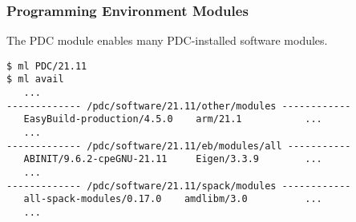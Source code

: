 \begin{frame}[fragile]
\frametitle{Programming Environment Modules}
    \begin{exampleblock}{
        The PDC module enables many PDC-installed software modules.
    }
    \begin{verbatim}
$ ml PDC/21.11
$ ml avail
   ...
------------- /pdc/software/21.11/other/modules ------------
   EasyBuild-production/4.5.0    arm/21.1           ...
   ...
------------- /pdc/software/21.11/eb/modules/all -----------
   ABINIT/9.6.2-cpeGNU-21.11     Eigen/3.3.9        ...
   ...
------------- /pdc/software/21.11/spack/modules ------------
   all-spack-modules/0.17.0    amdlibm/3.0          ...
   ...
    \end{verbatim}
    \end{exampleblock}
\end{frame}
